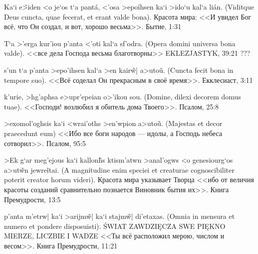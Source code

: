 


\begin{theorem}\label{cyt:byt1:31}%
\textnormal{\textgreek{Ka`i e\~>iden <o je`os t`a pant\'a, <'osa >epo\'ihsen ka`i >ido`u kal`a li\'an.}
(Viditque Deus cuncta, quae fecerat, et erant valde bona).
Красота мира:
<<И увидел Бог всё, что Он создал, и вот, хорошо весьма>>.
Бытие, 1:31}
\end{theorem}

\begin{theorem}\label{cyt:tyk39:21}%
\textnormal {\textgreek{T`a >'erga kur'iou p'anta <'oti kal`a sf'odra.}
(Opera domini universa bona valde).
<<все дела Господа весьма благотворны>>
EKLEZJASTYK, 39:21 ??? %
}
\end{theorem}

\begin{theorem}\label{cyt:ta3:11}%
\textnormal {\textgreek{s'un t`a p'anta >epo'ihsen kal`a >en kair\~w| a>uto\~u.}
(Cuncta fecit bona in tempore suo).
<<Всё соделал Он прекрасным в своё время>>.
Екклесиаст, 3:11}
\end{theorem}

\begin{theorem}\label{cyt:ps25:8}%
\textnormal{\textgreek{k'urie, >hg'aphsa e>upr'epeian o>'ikou sou.}
(Domine, dilexi decorem domus tuae).
<<Господи! возлюбил я обитель дома Твоего>>. 
Псалом, 25:8}
\end{theorem}

\begin{theorem}\label{cyt:ps95:5}%
\textnormal{\textgreek{>exomol'oghsis ka`i <wrai'oths >en'wpion a>uto\~u.}
(Majestas et decor praecedunt eum)
<<Ибо все боги народов — идолы, а Господь небеса сотворил>>.
Псалом, 95:5}
\end{theorem}

\begin{theorem}\label{cyt:prem13:5}%
\textnormal{\textgreek{>Ek g`ar meg'ejous ka`i kallon\~hs ktism'atwn >anal'ogws <o genesiourg`os a>ut\~wn jewre\~itai.}
(A magnitudine enim speciei et creaturae cognoscibiliter poterit creator horum videri).
Красота мира указывает Творца
<<ибо от величия красоты созданий сравнительно познается Виновник бытия их>>.
Книга Премудрости, 13:5}
\end{theorem}
	
\begin{theorem}\label{cyt:prem11:21}%
\textnormal{\textgreek{p'anta m'etrw| ka`i >arijm\~w| ka`i stajm\~w| di'etaxas.}
(Omnia in mensura et numero et pondere disposuisti).
ŚWIAT ZAWDZIĘCZA SWE PIĘKNO MIERZE, LICZBIE I WADZE
<<Ты всё расположил мерою, числом и весом>>.
Книга Премудрости, 11:21}
\end{theorem}

